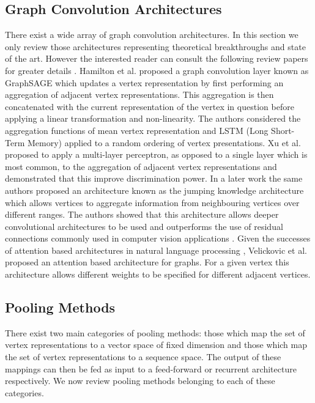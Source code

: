 \documentclass[runningheads]{llncs}
\begin{document}
\subsection{Graph Convolution Architectures}
\label{sec:related_works_graph_conv}
There exist a wide array of graph convolution architectures. In this section we only review those architectures representing theoretical breakthroughs and state of the art. However the interested reader can consult the following review papers for greater details \cite{zhang2018deep,wu2019comprehensive}. Hamilton et al. \cite{hamilton2017} proposed a graph convolution layer known as GraphSAGE which updates a vertex representation by first performing an aggregation of adjacent vertex representations. This aggregation is then concatenated with the current representation of the vertex in question before applying a linear transformation and non-linearity. The authors considered the aggregation functions of mean vertex representation and LSTM (Long Short-Term Memory) applied to a random ordering of vertex presentations. Xu et al. \cite{xu2018} proposed to apply a multi-layer perceptron, as opposed to a single layer which is most common, to the aggregation of adjacent vertex representations and demonstrated that this improve discrimination power. In a later work the same authors \cite{xu2018representation} proposed an architecture known as the jumping knowledge architecture which allows vertices to aggregate information from neighbouring vertices over different ranges. The authors showed that this architecture allows deeper convolutional architectures to be used and outperforms the use of residual connections commonly used in computer vision applications \cite{he2016deep}. Given the successes of attention based architectures in natural language processing \cite{vaswani2017attention}, Velickovic et al. \cite{velivckovic2017graph} proposed an attention based architecture for graphs. For a given vertex this architecture allows different weights to be specified for different adjacent vertices.

\subsection{Pooling Methods}
There exist two main categories of pooling methods: those which map the set of vertex representations to a vector space of fixed dimension and those which map the set of vertex representations to a sequence space. The output of these mappings can then be fed as input to a feed-forward or recurrent architecture respectively. We now review pooling methods belonging to each of these categories.
\end{document}
